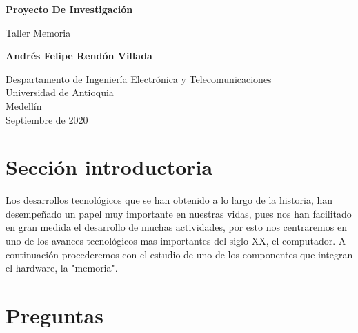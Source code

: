 \documentclass{article}
\begin{document}
\begin{titlepage}
    \begin{center}
        \vspace*{1cm}
            
        \Huge
        \textbf{Proyecto De Investigación}
            
        \vspace{0.5cm}
        \LARGE
        Taller Memoria
            
        \vspace{1.5cm}
            
        \textbf{Andrés Felipe Rendón Villada}
            
        \vfill
            
        \vspace{0.8cm}
            
        \Large
        Despartamento de Ingeniería Electrónica y Telecomunicaciones\\
        Universidad de Antioquia\\
        Medellín\\
        Septiembre de 2020
            
    \end{center}
\end{titlepage}

\tableofcontents

\section{Sección introductoria}
Los desarrollos tecnológicos que se han obtenido a lo largo de la historia, han desempeñado un papel muy importante en nuestras vidas, pues nos han facilitado en gran medida el desarrollo de muchas actividades, por esto nos centraremos en uno de los avances tecnológicos mas importantes del siglo XX, el computador. 
A continuación procederemos con el estudio de uno de los componentes que integran el hardware, la "memoria". 

\section{Preguntas} \label{contenido}
\end{document}
